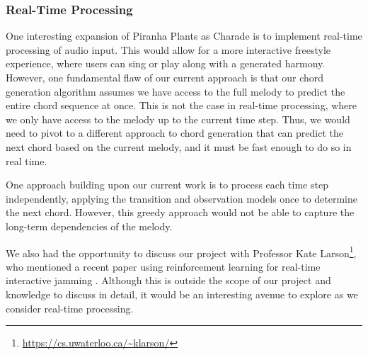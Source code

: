 \subsubsection{Real-Time Processing}

One interesting expansion of Piranha Plants as Charade is to implement real-time processing of audio input. This would allow for a more interactive freestyle experience, where users can sing or play along with a generated harmony. However, one fundamental flaw of our current approach is that our chord generation algorithm assumes we have access to the full melody to predict the entire chord sequence at once. This is not the case in real-time processing, where we only have access to the melody up to the current time step. Thus, we would need to pivot to a different approach to chord generation that can predict the next chord based on the current melody, and it must be fast enough to do so in real time.

One approach building upon our current work is to process each time step independently, applying the transition and observation models once to determine the next chord. However, this greedy approach would not be able to capture the long-term dependencies of the melody.

We also had the opportunity to discuss our project with Professor Kate Larson\footnote{\url{https://cs.uwaterloo.ca/~klarson/}}, who mentioned a recent paper using reinforcement learning for real-time interactive jamming \autocite{ReaLJam:2025}. Although this is outside the scope of our project and knowledge to discuss in detail, it would be an interesting avenue to explore as we consider real-time processing.

